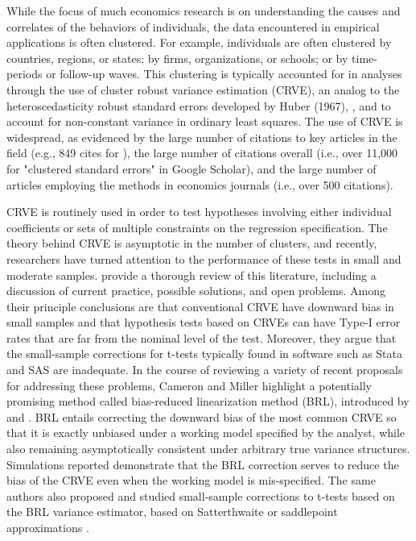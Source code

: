 \documentclass[12pt]{article}\usepackage[]{graphicx}\usepackage[]{color}
\begin{document}
While the focus of much economics research is on understanding the causes and correlates of the behaviors of individuals, the data encountered in empirical applications is often clustered. 
For example, individuals are often clustered by countries, regions, or states; by firms, organizations, or schools; or by time-periods or follow-up waves. 
This clustering is typically accounted for in analyses through the use of cluster robust variance estimation (CRVE), an analog to the heteroscedasticity robust standard errors developed by Huber (1967), \citet{eicker1967limit}, and \citet{White1980heteroskedasticity} to account for non-constant variance in ordinary least squares. 
The use of CRVE is widespread, as evidenced by the large number of citations to key articles in the field (e.g., 849 cites for \citealp{Wooldridge2003cluster}), the large number of citations overall (i.e., over 11,000 for "clustered standard errors" in Google Scholar), and the large number of articles employing the methods in economics journals (i.e., over 500 citations). 

CRVE is routinely used in order to test hypotheses involving either individual coefficients or sets of multiple constraints on the regression specification. 
The theory behind CRVE is asymptotic in the number of clusters, and recently, researchers have turned attention to the performance of these tests in small and moderate samples. 
\citet{Cameron2015practitioners} provide a thorough review of this literature, including a discussion of current practice, possible solutions, and open problems. 
Among their principle conclusions are that conventional CRVE have downward bias in small samples and that hypothesis tests based on CRVEs can have Type-I error rates that are far from the nominal level of the test.
Moreover, they argue that the small-sample corrections for t-tests typically found in software such as Stata and SAS are inadequate. 
In the course of reviewing a variety of recent proposals for addressing these problems, Cameron and Miller highlight a potentially promising method called bias-reduced linearization method (BRL), introduced by \citet{McCaffrey2001generalizations} and \citet{Bell2002bias}. 
BRL entails correcting the downward bias of the most common CRVE so that it is exactly unbiased under a working model specified by the analyst, while also remaining asymptotically consistent under arbitrary true variance structures. 
Simulations reported \citet{Bell2002bias} demonstrate that the BRL correction serves to reduce the bias of the CRVE even when the working model is mis-specified. 
The same authors also proposed and studied small-sample corrections to t-tests based on the BRL variance estimator, based on Satterthwaite \citet{Bell2002bias} or saddlepoint approximations \citep{McCaffrey2006improved}.
\end{document}
